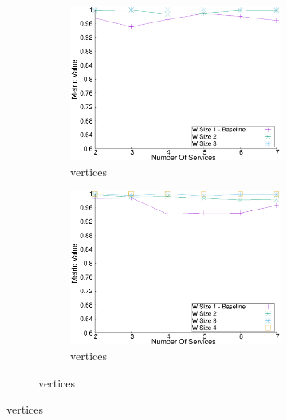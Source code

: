 \begin{figure}[H]
  \centering
  \begin{adjustbox}{minipage=\linewidth,scale=0.75}
    \begin{subfigure}{0.45\textwidth}
      \begin{subfigure}{\textwidth}
        \includegraphics[width=\textwidth]{Images/graphs/window_quality_performance_diff_qual_n7_s7_20_100_n3}
        \caption{ vertices}
        \label{fig:quality_window_wide_qualitative_n3}
      \end{subfigure}
      \begin{subfigure}{\textwidth}
        \includegraphics[width=\textwidth]{Images/graphs/window_quality_performance_diff_qual_n7_s7_20_100_n4}
        \caption{ vertices}

\end{subfigure}
\end{subfigure}
\end{adjustbox}
\end{figure}
